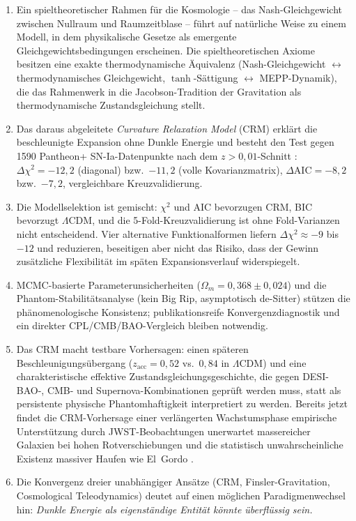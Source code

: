 \documentclass[aps,prd,twocolumn,superscriptaddress,nofootinbib]{revtex4-2}
\begin{document}
\begin{enumerate}
\item Ein spieltheoretischer Rahmen f\"ur die Kosmologie -- das Nash-Gleichgewicht zwischen Nullraum und Raumzeitblase -- f\"uhrt auf nat\"urliche Weise zu einem Modell, in dem physikalische Gesetze als emergente Gleichgewichtsbedingungen erscheinen. Die spieltheoretischen Axiome besitzen eine exakte thermodynamische \"Aquivalenz (Nash-Gleichgewicht $\leftrightarrow$ thermodynamisches Gleichgewicht, $\tanh$-S\"attigung $\leftrightarrow$ MEPP-Dynamik), die das Rahmenwerk in die Jacobson-Tradition der Gravitation als thermodynamische Zustandsgleichung \cite{Jacobson1995} stellt.
\item Das daraus abgeleitete \textit{Curvature Relaxation Model} (CRM) erklärt die beschleunigte Expansion ohne Dunkle Energie und besteht den Test gegen 1590 Pantheon+ SN-Ia-Datenpunkte nach dem $z>0{,}01$-Schnitt \cite{Scolnic2022}: $\Delta\chi^2 = -12{,}2$ (diagonal) bzw.\ $-11{,}2$ (volle Kovarianzmatrix), $\Delta\mathrm{AIC} = -8{,}2$ bzw.\ $-7{,}2$, vergleichbare Kreuzvalidierung.
\item Die Modellselektion ist gemischt: $\chi^2$ und AIC bevorzugen CRM, BIC bevorzugt $\Lambda$CDM, und die 5-Fold-Kreuzvalidierung ist ohne Fold-Varianzen nicht entscheidend. Vier alternative Funktionalformen liefern $\Delta\chi^2 \approx -9$ bis $-12$ und reduzieren, beseitigen aber nicht das Risiko, dass der Gewinn zusätzliche Flexibilität im späten Expansionsverlauf widerspiegelt.
\item MCMC-basierte Parameterunsicherheiten ($\Omega_m = 0{,}368 \pm 0{,}024$) und die Phantom-Stabilitätsanalyse (kein Big Rip, asymptotisch de-Sitter) stützen die phänomenologische Konsistenz; publikationsreife Konvergenzdiagnostik und ein direkter CPL/CMB/BAO-Vergleich bleiben notwendig.
\item Das CRM macht testbare Vorhersagen: einen späteren Beschleunigungsübergang ($z_{\mathrm{acc}} = 0{,}52$ vs.\ $0{,}84$ in $\Lambda$CDM) und eine charakteristische effektive Zustandsgleichungsgeschichte, die gegen DESI-BAO-, CMB- und Supernova-Kombinationen geprüft werden muss, statt als persistente physische Phantomhaftigkeit interpretiert zu werden. Bereits jetzt findet die CRM-Vorhersage einer verlängerten Wachstumsphase empirische Unterstützung durch JWST-Beobachtungen unerwartet massereicher Galaxien bei hohen Rotverschiebungen \cite{Labbe2023, BoylanKolchin2023} und die statistisch un\-wahrscheinliche Existenz massiver Haufen wie El~Gordo \cite{Asencio2023}.
\item Die Konvergenz dreier unabh\"angiger Ans\"atze (CRM, Finsler-Gravitation, Cosmological Teleodynamics) deutet auf einen m\"oglichen Paradigmenwechsel hin: \textit{Dunkle Energie als eigenst\"andige Entit\"at k\"onnte \"uberfl\"ussig sein.}
\end{enumerate}
\end{document}
